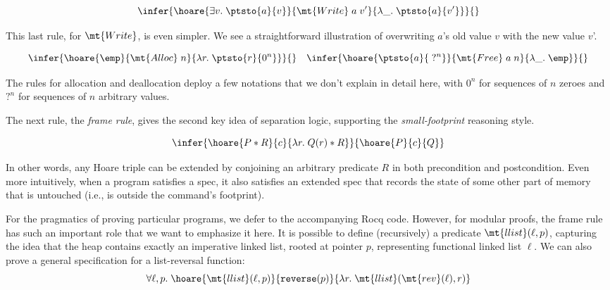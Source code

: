 \documentclass{amsbook}
\theoremstyle{definition}
\theoremstyle{remark}
\numberwithin{section}{chapter}
\numberwithin{equation}{chapter}
\begin{document}
$$\infer{\hoare{\exists v. \; \ptsto{a}{v}}{\mt{Write} \; a \; v'}{\lambda \_. \; \ptsto{a}{v'}}}{}$$

This last rule, for $\mt{Write}$, is even simpler.
We see a straightforward illustration of overwriting $a$'s old value $v$ with the new value $v$'.

$$\infer{\hoare{\emp}{\mt{Alloc} \; n}{\lambda r. \; \ptsto{r}{0^n}}}{}
\quad \infer{\hoare{\ptsto{a}{\; ?^n}}{\mt{Free} \; a \; n}{\lambda \_. \; \emp}}{}$$

The rules for allocation and deallocation deploy a few notations that we don't explain in detail here, with $0^n$ for sequences of $n$ zeroes and $?^n$ for sequences of $n$ arbitrary values.

The next rule, the \emph{frame rule}, gives the second key idea of separation logic, supporting the \emph{small-footprint} reasoning style.

$$\infer{\hoare{P * R}{c}{\lambda r. \; Q(r) * R}}{
  \hoare{P}{c}{Q}
}$$

In other words, any Hoare triple can be extended by conjoining an arbitrary predicate $R$ in both precondition and postcondition.
Even more intuitively, when a program satisfies a spec, it also satisfies an extended spec that records the state of some other part of memory that is untouched (i.e., is outside the command's footprint).

For the pragmatics of proving particular programs, we defer to the accompanying Rocq code.
\modularity
However, for modular proofs, the frame rule has such an important role that we want to emphasize it here.
It is possible to define (recursively) a predicate $\mt{llist}(\ell, p)$, capturing the idea that the heap contains exactly an imperative linked list, rooted at pointer $p$, representing functional linked list $\ell$.
We can also prove a general specification for a list-reversal function:
$$\forall \ell, p. \; \hoare{\mt{llist}(\ell, p)}{\texttt{reverse}(p)}{\lambda r. \; \mt{llist}(\mt{rev}(\ell), r)}$$
\end{document}
